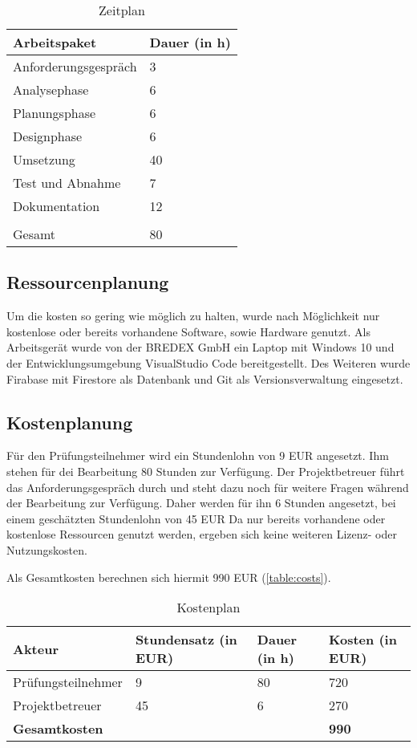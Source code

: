 \documentclass[12pt]{article}
\begin{document}
\begin{table}[H]
    \centering
    \begin{tabular}{|l | l|}
        \hline
        Arbeitspaket & Dauer (in h) \\
        \hline
        Anforderungsgespräch & 3 \\
        Analysephase & 6 \\
        Planungsphase & 6 \\
        Designphase & 6 \\
        Umsetzung & 40 \\
        Test und Abnahme & 7 \\
        Dokumentation & 12 \\
        &\\
        Gesamt & 80 \\
        \hline
    \end{tabular}
    \caption{Zeitplan}
    \label{table:timeplan}
\end{table}

\subsection{Ressourcenplanung}
Um die kosten so gering wie möglich zu halten, wurde nach Möglichkeit nur
kostenlose oder bereits vorhandene Software, sowie Hardware genutzt.
Als Arbeitsgerät wurde von der BREDEX GmbH ein Laptop mit Windows 10 und der
Entwicklungsumgebung VisualStudio Code bereitgestellt.
Des Weiteren wurde Firabase mit Firestore als Datenbank und Git als 
Versionsverwaltung eingesetzt.

\subsection{Kostenplanung}
Für den Prüfungsteilnehmer wird ein Stundenlohn von 9 EUR angesetzt.
Ihm stehen für dei Bearbeitung 80 Stunden zur Verfügung.
Der Projektbetreuer führt das Anforderungsgespräch durch und steht 
dazu noch für weitere Fragen während der Bearbeitung zur Verfügung.
Daher werden für ihn 6 Stunden angesetzt, bei einem geschätzten 
Stundenlohn von 45 EUR
Da nur bereits vorhandene oder kostenlose Ressourcen genutzt werden,
ergeben sich keine weiteren Lizenz- oder Nutzungskosten.

Als Gesamtkosten berechnen sich hiermit 990 EUR (\autoref{table:costs}).

\begin{table}[H]
    \centering
    \begin{tabular}{|l|l|l|l|}
        \hline
        Akteur & Stundensatz (in EUR) & Dauer (in h) & Kosten (in EUR) \\
        \hline
        Prüfungsteilnehmer & 9 & 80 & 720 \\
        Projektbetreuer & 45 & 6 & 270 \\
        \hline
        \textbf{Gesamtkosten} &&& \textbf{990} \\
        \hline
        
    \end{tabular}
    \caption{Kostenplan}
    \label{table:costs}
\end{table}
\end{document}
